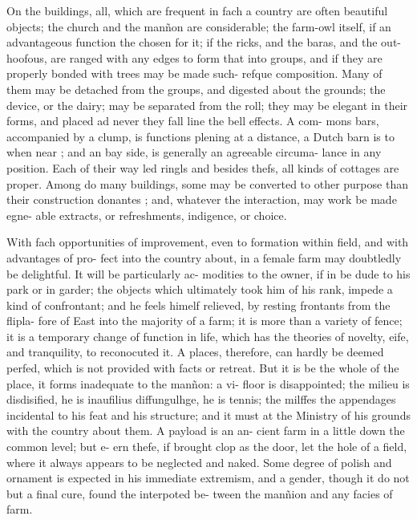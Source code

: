 \documentclass{article}
\begin{document}
On the buildings, all, which are frequent in fach a
country are often beautiful objects; the church and
the manñon are considerable; the farm-owl itself, if
an advantageous function the chosen for it; if the
ricks, and the baras, and the out-hoofous, are ranged
with any edges to form that into groups, and if they
are properly bonded with trees may be made such-
refque composition. Many of them may be detached
from the groups, and digested about the grounds;
the device, or the dairy; may be separated from
the roll; they may be elegant in their forms, and placed
ad never they fall line the bell effects. A com-
mons bars, accompanied by a clump, is functions
plening at a distance, a Dutch barn is to when near ;
and an bay side, is generally an agreeable circuma-
lance in any position. Each of their way led ringls
and besides thefs, all kinds of cottages are proper.
Among do many buildings, some may be converted to
other purpose than their construction donantes ; and,
whatever the interaction, may work be made egne-
able extracts, or refreshments, indigence, or choice.

With fach opportunities of improvement, even to
formation within field, and with advantages of pro-
fect into the country about, in a female farm may
doubtledly be delightful. It will be particularly ac-
modities to the owner, if in be dude to his park or in
garder; the objects which ultimately took him of
his rank, impede a kind of confrontant; and he feels
himelf relieved, by resting frontants from the flipla-
fore of East into the majority of a farm; it is more
than a variety of fence; it is a temporary change of
function in life, which has the theories of novelty,
eife, and tranquility, to reconocuted it. A places,
therefore, can hardly be deemed perfed, which is not
provided with facts or retreat. But it is be the whole
of the place, it forms inadequate to the manñon: a vi-
floor is disappointed; the milieu is disdisified, he is inaufilius diffungulhge, he is tennis; the
milffes the appendages incidental to his feat and his
structure; and it must at the Ministry of his grounds
with the country about them. A payload is an an-
cient farm in a little down the common level; but e-
ern thefe, if brought clop as the door, let the
hole of a field, where it always appears to be neglected
and naked. Some degree of polish and ornament
is expected in his immediate extremism, and a gender,
though it do not but a final cure, found the interpoted be-
tween the manñion and any facies of farm.
\end{document}

